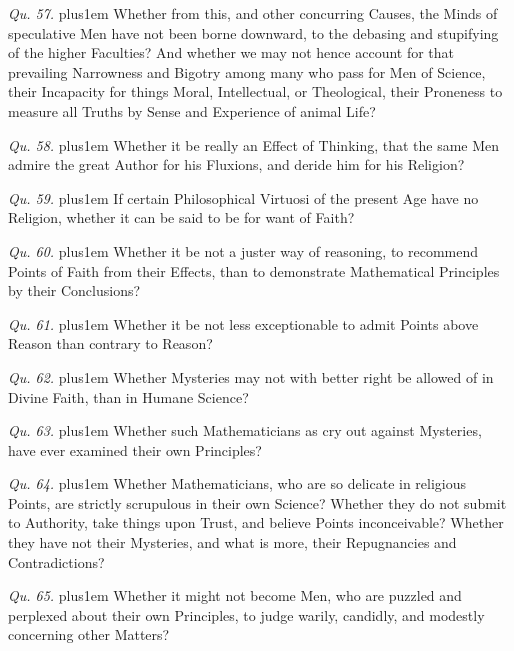 \item{\it Qu. 57.} \hskip 0pt plus1em
Whether from this, and other concurring Causes, the Minds of
speculative Men have not been borne downward, to the debasing and
stupifying of the higher Faculties?  And whether we may not hence
account for that prevailing Narrowness and Bigotry among many who
pass for Men of Science, their Incapacity for things Moral,
Intellectual, or Theological, their Proneness to measure all
Truths by Sense and Experience of animal Life?

\item{\it Qu. 58.} \hskip 0pt plus1em
Whether it be really an Effect of Thinking, that the same Men
admire the great Author for his Fluxions, and deride him for his
Religion?

\item{\it Qu. 59.} \hskip 0pt plus1em
If certain Philosophical Virtuosi of the present Age have no
Religion, whether it can be said to be for want of Faith?

\item{\it Qu. 60.} \hskip 0pt plus1em
Whether it be not a juster way of reasoning, to recommend Points
of Faith from their Effects, than to demonstrate Mathematical
Principles by their Conclusions?

\item{\it Qu. 61.} \hskip 0pt plus1em
Whether it be not less exceptionable to admit Points above Reason
than contrary to Reason?

\item{\it Qu. 62.} \hskip 0pt plus1em
Whether Mysteries may not with better right be allowed of in
Divine Faith, than in Humane Science?

\item{\it Qu. 63.} \hskip 0pt plus1em
Whether such Mathematicians as cry out against Mysteries, have
ever examined their own Principles?

\item{\it Qu. 64.} \hskip 0pt plus1em
Whether Mathematicians, who are so delicate in religious Points,
are strictly scrupulous in their own Science?  Whether they do
not submit to Authority, take things upon Trust, and believe
Points inconceivable?  Whether they have not their Mysteries, and
what is more, their Repugnancies and Contradictions?

\item{\it Qu. 65.} \hskip 0pt plus1em
Whether it might not become Men, who are puzzled and perplexed
about their own Principles, to judge warily, candidly, and
modestly concerning other Matters?

